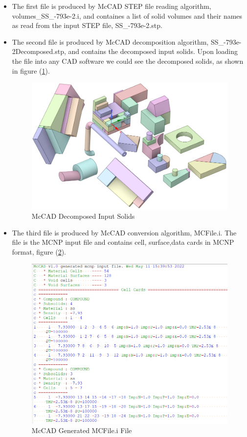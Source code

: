 \documentclass[letterpaper, 12 pt]{report}
\begin{document}
\begin{enumerate}
  \begin{itemize}
  	\item The first file is produced by McCAD STEP file reading algorithm, volumes\_SS\_-793e-2.i, and containes a list of solid volumes and their names as read from the input STEP file, SS\_-793e-2.stp.
  	
    \item The second file is produced by McCAD decomposition algorithm, SS\_-793e-2Decomposed.stp, and contains the decomposed input solids. Upon loading the file into any CAD software we could see the decomposed solids, as shown in figure (\ref{fig:Decomposed Solids}).
	\begin{figure}[h]
		\centering
		\includegraphics[scale=0.4]{figures/decomposedSolids.png}
		\caption{McCAD Decomposed Input Solids}
		\label{fig:Decomposed Solids}
	\end{figure}

	\item The third file is produced by McCAD conversion algorithm, MCFile.i. The file is the MCNP input file and contains cell, surface,data cards in MCNP format, figure (\ref{fig:MCFile}).
	\begin{figure}[h]
		\centering
		\includegraphics[scale=0.4]{figures/cellCards.png}
		\caption{McCAD Generated MCFile.i File}
		\label{fig:MCFile}
	\end{figure}


\end{itemize}
\end{enumerate}
\end{document}
